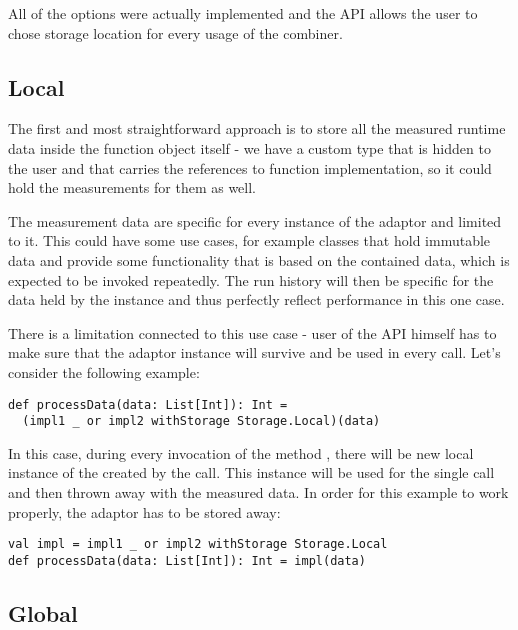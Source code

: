 All of the options were actually implemented and the API allows the user to chose storage location for every usage of the combiner.

\subsection{Local}

The first and most straightforward approach is to store all the measured runtime data inside the function object itself - we have a custom type  that is hidden to the user and that carries the references to function implementation, so it could hold the measurements for them as well.

The measurement data are specific for every instance of the adaptor and limited to it. This could have some use cases, for example classes that hold immutable data and provide some functionality that is based on the contained data, which is expected to be invoked repeatedly. The run history will then be specific for the data held by the instance and thus perfectly reflect performance in this one case.

There is a limitation connected to this use case - user of the API himself has to make sure that the adaptor instance will survive and be used in every call. Let's consider the following example:

\lstset{style=Scala}
\begin{lstlisting}
def processData(data: List[Int]): Int = 
  (impl1 _ or impl2 withStorage Storage.Local)(data)
\end{lstlisting}

In this case, during every invocation of the method , there will be new local instance of the  created by the  call. This instance will be used for the single call and then thrown away with the measured data. In order for this example to work properly, the adaptor has to be stored away:

\lstset{style=Scala}
\begin{lstlisting}
val impl = impl1 _ or impl2 withStorage Storage.Local
def processData(data: List[Int]): Int = impl(data)
\end{lstlisting}

\subsection{Global}

